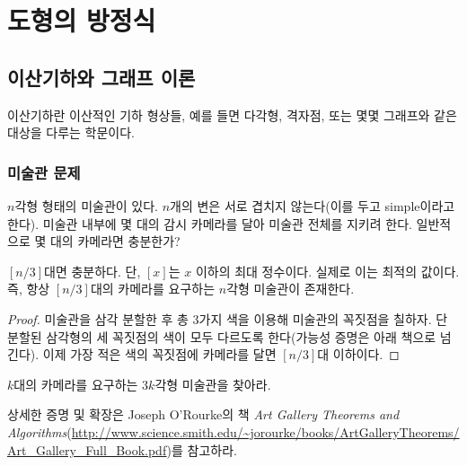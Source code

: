 \part{도형의 방정식}
\chapter{이산기하와 그래프 이론}
이산기하란 이산적인 기하 형상들, 예를 들면 다각형, 격자점, 또는 몇몇 그래프와 같은 대상을 다루는 학문이다. 
\section{미술관 문제}
\begin{question}
$n$각형 형태의 미술관이 있다. $n$개의 변은 서로 겹치지 않는다(이를 두고 simple이라고 한다). 
미술관 내부에 몇 대의 감시 카메라를 달아 미술관 전체를 지키려 한다. 일반적으로 몇 대의 카메라면 충분한가?
\end{question}
\begin{theorem}
$[n/3]$대면 충분하다. 단, $[x]$는 $x$ 이하의 최대 정수이다. 실제로 이는 최적의 값이다. 즉, 항상 $[n/3]$대의 카메라를 요구하는 $n$각형 미술관이 존재한다.
\end{theorem}
\begin{proof}
미술관을 삼각 분할한 후 총 3가지 색을 이용해 미술관의 꼭짓점을 칠하자. 단 분할된 삼각형의 세 꼭짓점의 색이 모두 다르도록 한다(가능성 증명은 아래 책으로 넘긴다).
이제 가장 적은 색의 꼭짓점에 카메라를 달면 $[n/3]$대 이하이다.
\end{proof}
\begin{exercise}
 $k$대의 카메라를 요구하는 $3k$각형 미술관을 찾아라.
\end{exercise}
\begin{remark}
상세한 증명 및 확장은 Joseph O'Rourke의 책 \textit{Art Gallery Theorems and Algorithms}(\url{http://www.science.smith.edu/~jorourke/books/ArtGalleryTheorems/Art_Gallery_Full_Book.pdf})를 참고하라. 
\end{remark}
